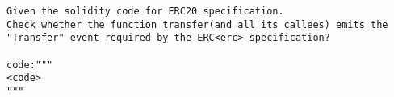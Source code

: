 \begin{lstlisting}[label={lst:exp-inst-detail-ask-event},captionpos=b, caption={Example of prompt in instruction experiment explicitly asking event emission},language=GPTPrompt]
Given the solidity code for ERC20 specification.
Check whether the function transfer(and all its callees) emits the "Transfer" event required by the ERC<erc> specification?

code:"""
<code>
"""
\end{lstlisting}